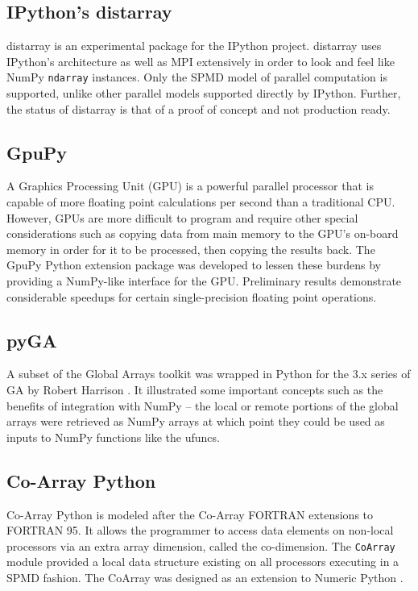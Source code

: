 \documentclass{sigplanconf}
\begin{document}
\subsection{IPython's distarray}

distarray \cite{Per09} is an experimental package for the IPython project.
distarray uses IPython’s architecture as well as MPI extensively in order to
look and feel like NumPy \verb=ndarray= instances. Only the SPMD model of
parallel computation is supported, unlike other parallel models supported
directly by IPython.  Further, the status of distarray is that of a proof of
concept and not production ready.

\subsection{GpuPy}

A Graphics Processing Unit (GPU) is a powerful parallel processor that is
capable of more floating point calculations per second than a traditional CPU.
However, GPUs are more difficult to program and require other special
considerations such as copying data from main memory to the GPU’s on-board
memory in order for it to be processed, then copying the results back. The
GpuPy \cite{Eit07} Python extension package was developed to lessen these
burdens by providing a NumPy-like interface for the GPU. Preliminary results
demonstrate considerable speedups for certain single-precision floating point
operations.

\subsection{pyGA}

A subset of the Global Arrays toolkit was wrapped in Python for the 3.x series
of GA by Robert Harrison \cite{Har99}. It illustrated some important concepts
such as the benefits of integration with NumPy -- the local or remote portions
of the global arrays were retrieved as NumPy arrays at which point they could
be used as inputs to NumPy functions like the ufuncs.

\subsection{Co-Array Python}

Co-Array Python \cite{Ras04} is modeled after the Co-Array FORTRAN extensions
to FORTRAN 95. It allows the programmer to access data elements on non-local
processors via an extra array dimension, called the co-dimension. The
\verb=CoArray= module provided a local data structure existing on all
processors executing in a SPMD fashion. The CoArray was designed as an
extension to Numeric Python \cite{Asc99}.
\end{document}

